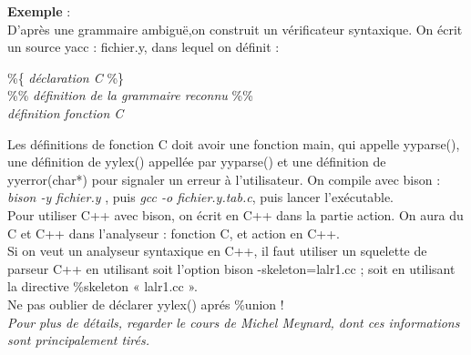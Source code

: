 \textbf{Exemple} :\\
D'après une grammaire ambiguë,on construit un vérificateur syntaxique. On écrit un source yacc : fichier.y, dans lequel on définit :

\%\{  \textit{déclaration C} \%\}\\
\%\% \textit{définition de la grammaire reconnu} \%\%\\
\textit{définition fonction C}

Les définitions de fonction C  doit avoir une fonction main, qui appelle yyparse(), une définition de yylex() appellée par yyparse() et une définition de yyerror(char*) pour signaler un erreur à l'utilisateur.
On compile avec bison : \textit{bison -y fichier.y} , puis \textit{gcc -o fichier.y.tab.c}, puis lancer l’exécutable.\\
Pour utiliser C++ avec bison, on écrit en C++ dans la partie action. On aura du C et C++ dans l'analyseur : fonction C, et action en C++.\\

Si on veut un analyseur syntaxique en C++, il faut utiliser un squelette de parseur C++ en utilisant soit l'option bison -skeleton=lalr1.cc ; soit en utilisant la directive \%skeleton « lalr1.cc ».\\ Ne pas oublier de déclarer yylex() aprés \%union !\\
\textit{Pour plus de détails, regarder le cours de Michel Meynard, dont ces informations sont principalement tirés.}
